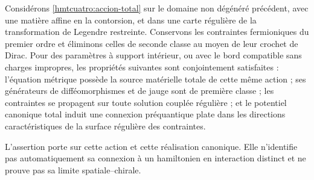 \begin{theorem}
\label{hmtcuatro:teorema-canonico-total} Considérons \eqref{hmtcuatro:accion-total} sur le domaine non dégénéré précédent, avec une matière affine en la contorsion, et dans une carte régulière de la transformation de Legendre restreinte. Conservons les contraintes fermioniques du premier ordre et éliminons celles de seconde classe au moyen de leur crochet de Dirac. Pour des paramètres à support intérieur, ou avec le bord compatible sans charges impropres, les propriétés suivantes sont conjointement satisfaites : l’équation métrique possède la source matérielle totale de cette même action ; ses générateurs de difféomorphismes et de jauge sont de première classe ; les contraintes se propagent sur toute solution couplée régulière ; et le potentiel canonique total induit une connexion préquantique plate dans les directions caractéristiques de la surface régulière des contraintes.

L’assertion porte sur cette action et cette réalisation canonique. Elle n’identifie pas automatiquement sa connexion à un hamiltonien en interaction distinct et ne prouve pas sa limite spatiale--chirale.
\end{theorem}

